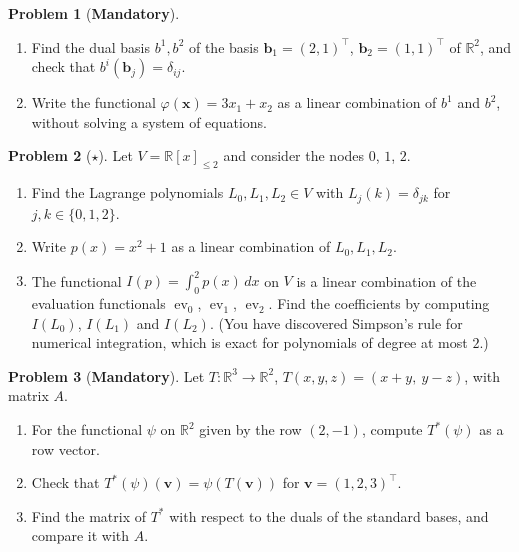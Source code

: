 \documentclass[11pt]{article}
\theoremstyle{definition}
\newtheorem{problem}{Problem}[section]
\newcommand{\mandatory}{\textcolor{red!70!black}{\textbf{Mandatory}}}
\begin{document}
\begin{problem}[\mandatory]\label{pr:dual-basis-r2}
    \begin{enumerate}[label=(\alph*)]
        \item Find the dual basis $b^1, b^2$ of the basis $\mathbf{b}_1 = (2, 1)^\top$, $\mathbf{b}_2 = (1, 1)^\top$ of $\mathbb{R}^2$, and check that $b^i(\mathbf{b}_j) = \delta_{ij}$.
        \item Write the functional $\varphi(\mathbf{x}) = 3x_1 + x_2$ as a linear combination of $b^1$ and $b^2$, without solving a system of equations.
    \end{enumerate}
\end{problem}

\begin{problem}[$\star$]\label{pr:lagrange-simpson}
    Let $V = \mathbb{R}[x]_{\leq 2}$ and consider the nodes $0$, $1$, $2$.
    \begin{enumerate}[label=(\alph*)]
        \item Find the Lagrange polynomials $L_0, L_1, L_2 \in V$ with $L_j(k) = \delta_{jk}$ for $j, k \in \{0, 1, 2\}$.
        \item Write $p(x) = x^2 + 1$ as a linear combination of $L_0, L_1, L_2$.
        \item The functional $I(p) = \int_0^2 p(x)\, dx$ on $V$ is a linear combination of the evaluation functionals $\operatorname{ev}_0$, $\operatorname{ev}_1$, $\operatorname{ev}_2$. Find the coefficients by computing $I(L_0)$, $I(L_1)$ and $I(L_2)$. (You have discovered Simpson's rule for numerical integration, which is exact for polynomials of degree at most $2$.)
    \end{enumerate}
\end{problem}

\begin{problem}[\mandatory]\label{pr:dual-map}
    Let $T: \mathbb{R}^3 \to \mathbb{R}^2$, $T(x, y, z) = (x + y, \ y - z)$, with matrix $A$.
    \begin{enumerate}[label=(\alph*)]
        \item For the functional $\psi$ on $\mathbb{R}^2$ given by the row $(2, -1)$, compute $T^*(\psi)$ as a row vector.
        \item Check that $T^*(\psi)(\mathbf{v}) = \psi(T(\mathbf{v}))$ for $\mathbf{v} = (1, 2, 3)^\top$.
        \item Find the matrix of $T^*$ with respect to the duals of the standard bases, and compare it with $A$.
    \end{enumerate}
\end{problem}
\end{document}
